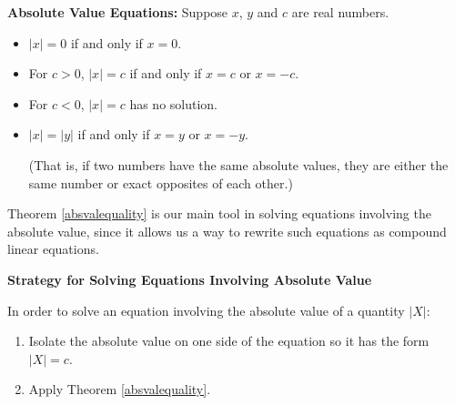 \documentclass{ximera}
\begin{document}
\colorbox{ResultColor}{\bbm

\begin{theorem} \textbf{Absolute Value Equations: }\label{absvalequality}  Suppose $x$, $y$ and $c$ are real numbers.

\begin{itemize}

\item  $|x| = 0$ if and only if $x = 0$.

\item  For $c > 0$, $|x| = c$ if and only if $x = c$ or $x = -c$.

\item  For $c < 0$, $|x| = c$ has no solution.

\item  $|x| = |y|$ if and only if $x = y$ or $x = -y$. 

(That is,  if two numbers have the same absolute values, they are either the same number or exact opposites of each other.) 

\end{itemize}

\end{theorem}

\ebm}

\medskip

Theorem \ref{absvalequality} is our main tool in solving equations involving the absolute value, since it allows us a way to rewrite such equations as compound linear equations.

\medskip

\label{strategyforsolvingabseqns}

\colorbox{ResultColor}{\bbm

\centerline{\textbf{Strategy for Solving Equations Involving Absolute Value}}

\vspace{0.05in}

In order to solve an equation involving the absolute value of a quantity $|X|$:

\begin{enumerate}

\item  Isolate the absolute value on one side of the equation so it has the form $|X| = c$.

\item  Apply Theorem \ref{absvalequality}.

\end{enumerate}

\ebm}
\end{document}
